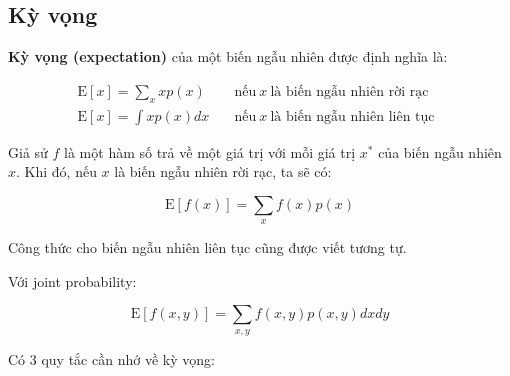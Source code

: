\documentclass[../main-report.tex]{subfiles}
\begin{document}
\subsection{Kỳ vọng}
\textbf{Kỳ vọng (expectation)} của một biến ngẫu nhiên được định nghĩa là:

\begin{eqnarray}
  \text{E}[x] = \sum_x x p(x) \quad & \text{nếu}~ x ~ \text{là biến ngẫu nhiên rời rạc} \quad \\
  \text{E}[x] = \int x p(x) dx \quad & \text{nếu}~ x ~ \text{là biến ngẫu nhiên liên tục}
\end{eqnarray}

Giả sử \(f\) là một hàm số trả về một giá trị với mỗi giá trị \(x^*\) của biến ngẫu nhiên \(x\). Khi đó, nếu \(x\) là biến ngẫu nhiên rời rạc, ta sẽ có:

\begin{equation}
	\text{E}[f(x)] = \sum_x f(x) p(x)
\end{equation}

Công thức cho biến ngẫu nhiên liên tục cũng được viết tương tự.

Với joint probability:

\begin{equation}
\text{E}[f(x, y)] = \sum_{x,y} f(x, y) p(x, y) dx dy
\end{equation}

Có 3 quy tắc cần nhớ về kỳ vọng:
\end{document}
